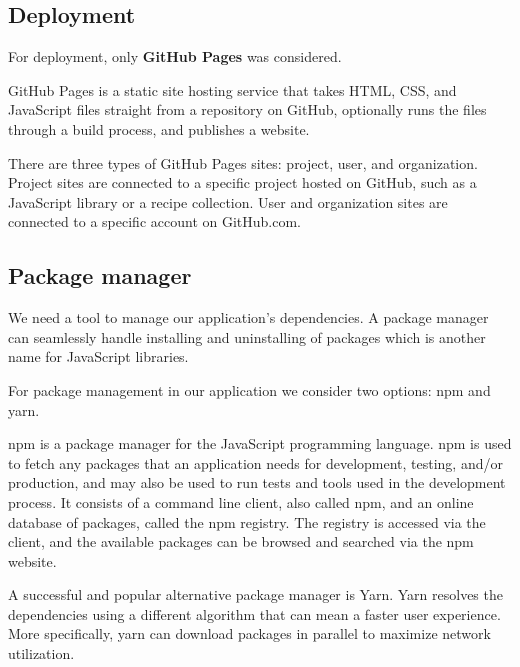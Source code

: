 

\subsection{Deployment}
  For deployment, only \textbf{GitHub Pages} was considered.

  GitHub Pages is a static site hosting service that takes HTML, CSS, and JavaScript files straight from a repository on GitHub, optionally runs the files through a build process, and publishes a website.

  There are three types of GitHub Pages sites: project, user, and organization. Project sites are connected to a specific project hosted on GitHub, such as a JavaScript library or a recipe collection. User and organization sites are connected to a specific account on GitHub.com.


\subsection{Package manager}
  We need a tool to manage our application's dependencies.
  A package manager can seamlessly handle installing and uninstalling of packages which is another name for JavaScript libraries.

  For package management in our application we consider two options: npm and yarn.

  npm is a package manager for the JavaScript programming language.
  npm is used to fetch any packages that an application needs for development, testing, and/or production, and may also be used to run tests and tools used in the development process.
  It consists of a command line client, also called npm, and an online database of packages, called the npm registry. 
  The registry is accessed via the client, and the available packages can be browsed and searched via the npm website.

  A successful and popular alternative package manager is Yarn. 
  Yarn resolves the dependencies using a different algorithm that can mean a faster user experience.
  More specifically, yarn can download packages in parallel to maximize network utilization.

